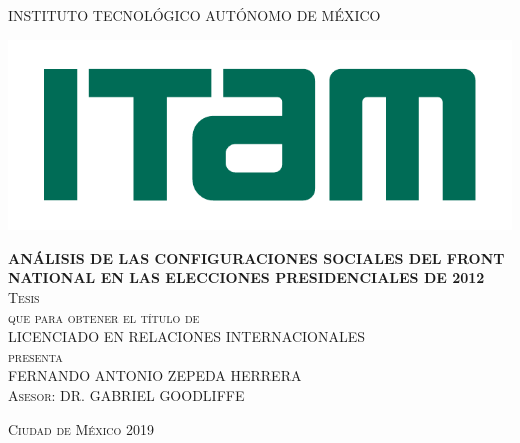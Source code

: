 \begin{titlepage}

\begin{center}

\large{INSTITUTO TECNOLÓGICO AUTÓNOMO DE MÉXICO}\\

\begin{center}
	\includegraphics[scale=0.8]{Figs/logo-ITAM.pdf}
\end{center}

\textsc{\large \textbf{ANÁLISIS DE LAS CONFIGURACIONES SOCIALES DEL FRONT NATIONAL EN LAS ELECCIONES PRESIDENCIALES DE 2012}}\\[2em]

\textsc{\large Tesis}\\[1em]

\textsc{que para obtener el título de}\\[1em]

\textsc{LICENCIADO EN RELACIONES INTERNACIONALES}\\[1em]

\textsc{presenta}\\[1em]

\textsc{\Large FERNANDO ANTONIO ZEPEDA HERRERA}\\[1em]

\textsc{\large Asesor: DR. GABRIEL GOODLIFFE}

\end{center}

\vspace*{\fill}
\textsc{Ciudad de México \hspace*{\fill} 2019}

\end{titlepage}